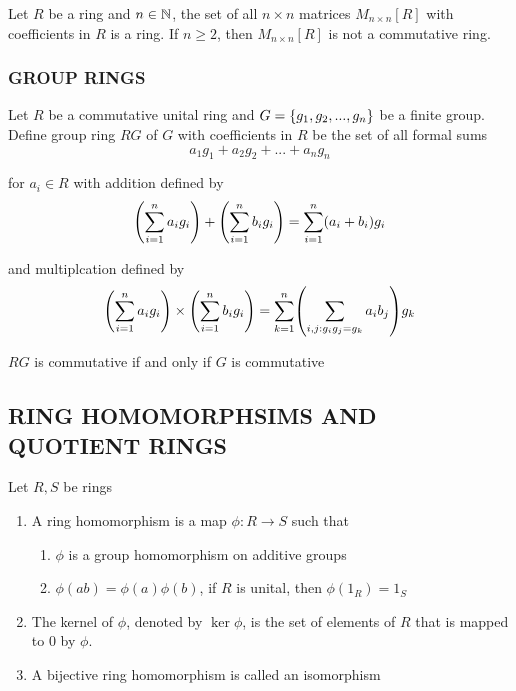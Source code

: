 \begin{proposition}
	Let $R$ be a ring and $n \in \N$, the set of all $n \times n$ matrices $M_{n \times n}[R]$ with coefficients in $R$ is a ring. If $n \geq 2$, then $M_{n \times n}[R]$ is not a commutative ring.
\end{proposition}


\subsubsection{GROUP RINGS}

\begin{definition}
	Let $R$ be a commutative unital ring and $G = \set{g_1, g_2, ..., g_n}$ be a finite group. Define group ring $RG$ of $G$ with coefficients in $R$ be the set of all formal sums
	$$
		a_1 g_1 + a_2 g_2 + ... + a_n g_n
	$$
	
	for $a_i \in R$ with addition defined by
	$$
		\tuple*{\sum_{i=1}^n a_i g_i} + \tuple*{\sum_{i=1}^n b_i g_i} = \sum_{i=1}^n (a_i + b_i) g_i
	$$
	
	and multiplcation defined by
	$$
		\tuple*{\sum_{i=1}^n a_i g_i} \times \tuple*{\sum_{i=1}^n b_i g_i} = \sum_{k=1}^n \tuple*{\sum_{i, j: g_i g_j = g_k} a_i b_j} g_k
	$$
\end{definition}

\begin{proposition}
	$RG$ is commutative if and only if $G$ is commutative
\end{proposition}

\subsection{RING HOMOMORPHSIMS AND QUOTIENT RINGS}

\begin{definition}
	Let $R, S$ be rings
	\begin{enumerate}
		\item A ring homomorphism is a map $\phi: R \to S$ such that
		\begin{enumerate}
			\item $\phi$ is a group homomorphism on additive groups
			\item $\phi(ab) = \phi(a) \phi(b)$, if $R$ is unital, then $\phi(1_R) = 1_S$
		\end{enumerate}
		
		\item The kernel of $\phi$, denoted by $\ker \phi$, is the set of elements of $R$ that is mapped to $0$ by $\phi$.
		
		\item A bijective ring homomorphism is called an isomorphism
	\end{enumerate}
\end{definition}

